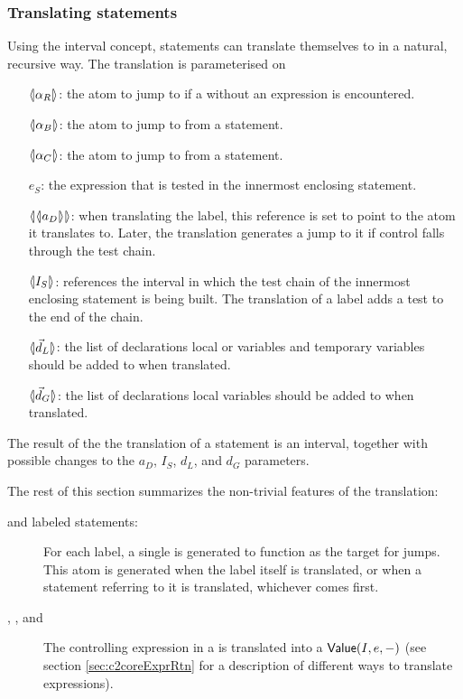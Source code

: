 \begin{docpart}
\subsubsection{Translating \ansiC statements}
\label{sec:c2coreStatements}
Using the interval concept, \ansiC statements can translate
themselves to \coreC in a natural, recursive way. The translation is
parameterised on
\begin{itemize}
\item [$\langle\!|\alpha_R|\!\rangle$:] the atom to jump to if a
         without an expression is encountered.
\item [$\langle\!|\alpha_B|\!\rangle$:] the atom to jump to from a
         statement.
\item [$\langle\!|\alpha_C|\!\rangle$:] the atom to jump to from a
         statement.
\item [$e_S$:] the expression that is tested in the innermost
        enclosing  statement.
\item [$\langle\!|\langle\!|a_D|\!\rangle|\!\rangle$:] when translating the
         label, this reference is set to
        point to the atom it translates to. Later, the
         translation generates a jump to
        it if control falls through the test chain.
\item [$\langle\!|I_S|\!\rangle$:] references the interval in which
        the test chain of the innermost enclosing
         statement is being built. The
        translation of a  label adds a
        test to the end of the chain.
\item [$\coreXref{\vec d_L}$:] the list of declarations
        local  or  variables
        and temporary variables should be added to when
        translated.
\item [$\coreXref{\vec d_G}$:] the list of declarations
        local  variables should be added to
        when translated.
\end{itemize}
The result of the the translation of a statement is an
interval, together with possible changes to the $a_D$, $I_S$,
$d_L$, and $d_G$ parameters.

The rest of this section summarizes the non-trivial features
of the translation:
\begin{description}
\item[ and labeled statements:] For each label,
        a single  is generated to function
        as the target for  jumps. This atom
        is generated when the label itself is translated,
        or when a  statement referring to it
        is translated, whichever comes first.
\item[, , and ]
        The controlling expression in a  is
        translated into a $\textsf{Value}(I,e,-)$ (see section
        \vref{sec:c2coreExprRtn} for a description of different
        ways to translate expressions).


\end{description}
\end{docpart}
